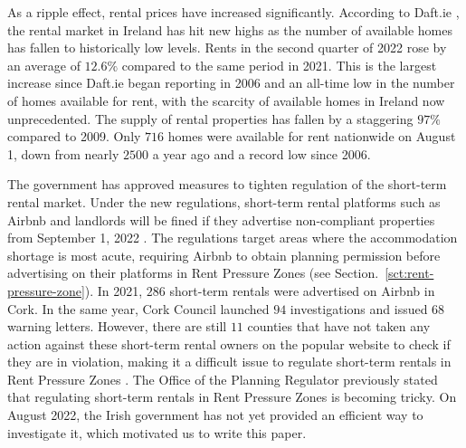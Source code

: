 \documentclass[conference, compsoc]{IEEEtran}
\begin{document}
As a ripple effect, rental prices have increased significantly.
According to Daft.ie \cite{daft.ie-report}, the rental market in Ireland has hit new highs as the number of available homes has fallen to historically low levels.
Rents in the second quarter of 2022 rose by an average of $12.6\%$ compared to the same period in 2021.
This is the largest increase since Daft.ie began reporting in 2006 and an all-time low in the number of homes available for rent, with the scarcity of available homes in Ireland now unprecedented.
The supply of rental properties has fallen by a staggering $97\%$ compared to 2009.
Only $716$ homes were available for rent nationwide on August 1, down from nearly $2500$ a year ago and a record low since 2006.

The government has approved measures to tighten regulation of the short-term rental market.
Under the new regulations, short-term rental platforms such as Airbnb and landlords will be fined if they advertise non-compliant properties from September 1, 2022 \cite{short-term-property-rental}.
The regulations target areas where the accommodation shortage is most acute, requiring Airbnb to obtain planning permission before advertising on their platforms in Rent Pressure Zones (see Section.~\ref{sct:rent-pressure-zone}).
In 2021, $286$ short-term rentals were advertised on Airbnb in Cork.
In the same year, Cork Council launched $94$ investigations and issued $68$ warning letters.
However, there are still $11$ counties that have not taken any action against these short-term rental owners on the popular website to check if they are in violation, making it a difficult issue to regulate short-term rentals in Rent Pressure Zones \cite{counties-clamp-down-rental}.
The Office of the Planning Regulator previously stated that regulating short-term rentals in Rent Pressure Zones is becoming tricky.
On August 2022, the Irish government has not yet provided an efficient way to investigate it, which motivated us to write this paper.
\end{document}
